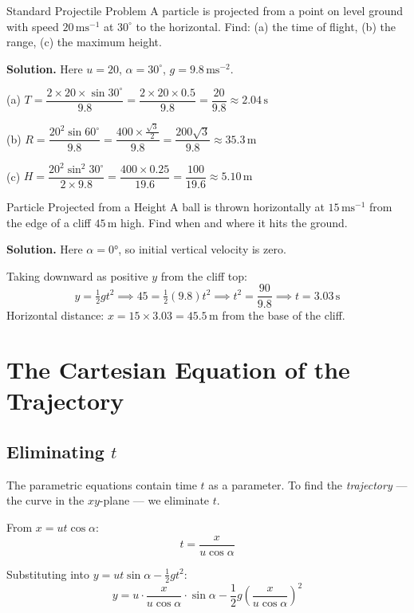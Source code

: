 \documentclass[12pt, a4paper]{book}
\newcommand{\ms}{\,\mathrm{ms}^{-1}}
\newcommand{\mss}{\,\mathrm{ms}^{-2}}
\newcommand{\m}{\,\mathrm{m}}
\begin{document}
\begin{exmp}{Standard Projectile Problem}{}
A particle is projected from a point on level ground with speed $20\ms$ at $30^\circ$ to the horizontal. Find: (a) the time of flight, (b) the range, (c) the maximum height.

\medskip
\textbf{Solution.} Here $u = 20$, $\alpha = 30^\circ$, $g = 9.8\mss$.

(a) $T = \dfrac{2 \times 20 \times \sin 30^\circ}{9.8} = \dfrac{2 \times 20 \times 0.5}{9.8} = \dfrac{20}{9.8} \approx 2.04\,\mathrm{s}$

(b) $R = \dfrac{20^2 \sin 60^\circ}{9.8} = \dfrac{400 \times \frac{\sqrt{3}}{2}}{9.8} = \dfrac{200\sqrt{3}}{9.8} \approx 35.3\,\mathrm{m}$

(c) $H = \dfrac{20^2 \sin^2 30^\circ}{2 \times 9.8} = \dfrac{400 \times 0.25}{19.6} = \dfrac{100}{19.6} \approx 5.10\,\mathrm{m}$
\end{exmp}

\begin{exmp}{Particle Projected from a Height}{}
A ball is thrown horizontally at $15\ms$ from the edge of a cliff $45\m$ high. Find when and where it hits the ground.

\medskip
\textbf{Solution.} Here $\alpha = 0°$, so initial vertical velocity is zero.

Taking downward as positive $y$ from the cliff top:
\[
  y = \tfrac{1}{2}gt^2 \implies 45 = \tfrac{1}{2}(9.8)t^2 \implies t^2 = \frac{90}{9.8} \implies t = 3.03\,\mathrm{s}
\]
Horizontal distance: $x = 15 \times 3.03 = 45.5\,\mathrm{m}$ from the base of the cliff.
\end{exmp}

\section{The Cartesian Equation of the Trajectory}

\subsection{Eliminating $t$}

The parametric equations contain time $t$ as a parameter. To find the \emph{trajectory} --- the curve in the $xy$-plane --- we eliminate $t$.

From $x = ut\cos\alpha$:
\[
  t = \frac{x}{u\cos\alpha}
\]

Substituting into $y = ut\sin\alpha - \frac{1}{2}gt^2$:
\[
  y = u \cdot \frac{x}{u\cos\alpha} \cdot \sin\alpha - \frac{1}{2}g\left(\frac{x}{u\cos\alpha}\right)^2
\]
\end{document}
